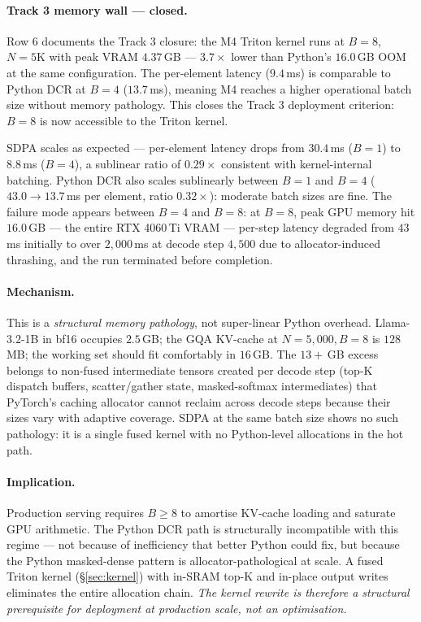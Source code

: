 \documentclass[11pt]{article}
\theoremstyle{definition}
\theoremstyle{remark}
\theoremstyle{plain}
\begin{document}
\paragraph{Track 3 memory wall --- closed.}
Row 6 documents the Track 3 closure: the M4 Triton kernel runs at $B\!=\!8$,
$N\!=\!5\text{K}$ with peak VRAM $4.37$\,GB --- $3.7\times$ lower than Python's
$16.0$\,GB OOM at the same configuration. The per-element latency ($9.4$\,ms) is
comparable to Python DCR at $B\!=\!4$ ($13.7$\,ms), meaning M4 reaches a higher
operational batch size without memory pathology. This closes the Track 3 deployment
criterion: $B\!=\!8$ is now accessible to the Triton kernel.

SDPA scales as expected --- per-element latency drops from $30.4$\,ms ($B\!=\!1$)
to $8.8$\,ms ($B\!=\!4$), a sublinear ratio of $0.29\times$ consistent with
kernel-internal batching. Python DCR also scales sublinearly between $B\!=\!1$ and
$B\!=\!4$ ($43.0\!\to\!13.7$\,ms per element, ratio $0.32\times$): moderate batch
sizes are fine. The failure mode appears between $B\!=\!4$ and $B\!=\!8$: at
$B\!=\!8$, peak GPU memory hit $16.0$\,GB --- the entire RTX 4060\,Ti VRAM ---
per-step latency degraded from $43$\,ms initially to over $2{,}000$\,ms at decode
step $4{,}500$ due to allocator-induced thrashing, and the run terminated before
completion.

\paragraph{Mechanism.} This is a \emph{structural memory pathology},
not super-linear Python overhead. Llama-3.2-1B in bf16 occupies $2.5$\,GB; the
GQA KV-cache at $N\!=\!5{,}000,B\!=\!8$ is $128$\,MB; the working set should fit
comfortably in $16$\,GB. The $13{+}$\,GB excess belongs to non-fused intermediate
tensors created per decode step (top-K dispatch buffers, scatter/gather state,
masked-softmax intermediates) that PyTorch's caching allocator cannot reclaim
across decode steps because their sizes vary with adaptive coverage. SDPA at the
same batch size shows no such pathology: it is a single fused kernel with no
Python-level allocations in the hot path.

\paragraph{Implication.} Production serving requires $B\!\geq\!8$ to amortise
KV-cache loading and saturate GPU arithmetic. The Python DCR path is structurally
incompatible with this regime --- not because of inefficiency that better Python
could fix, but because the Python masked-dense pattern is allocator-pathological
at scale. A fused Triton kernel (§\ref{sec:kernel}) with in-SRAM top-K and in-place
output writes eliminates the entire allocation chain. \emph{The kernel rewrite is
therefore a structural prerequisite for deployment at production scale,
not an optimisation.}
\end{document}
